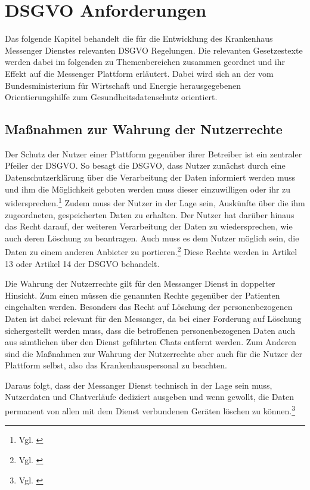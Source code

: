 \section{DSGVO Anforderungen}\label{section:dsgvo}
Das folgende Kapitel behandelt die für die Entwicklung des Krankenhaus Messenger Dienstes relevanten DSGVO Regelungen. Die relevanten Gesetzestexte werden dabei im folgenden zu Themenbereichen zusammen geordnet und ihr Effekt auf die Messenger Plattform erläutert. Dabei wird sich an der vom Bundesministerium für Wirtschaft und Energie herausgegebenen Orientierungshilfe zum Gesundheitsdatenschutz orientiert.

\subsection{Maßnahmen zur Wahrung der Nutzerrechte}\label{subsection:mzwdn}
Der Schutz der Nutzer einer Plattform gegenüber ihrer Betreiber ist ein zentraler Pfeiler der DSGVO. So besagt die DSGVO, dass Nutzer zunächst durch eine Datenschutzerklärung über die Verarbeitung der Daten informiert werden muss und ihm die Möglichkeit geboten werden muss dieser einzuwilligen oder ihr zu widersprechen.\footnote{Vgl. \cite[S. 3]{OrientierungshilfezumGesundheitsdatenschutz2018}} Zudem muss der Nutzer in der Lage sein, Auskünfte über die ihm zugeordneten, gespeicherten Daten zu erhalten. Der Nutzer hat darüber hinaus das Recht darauf, der weiteren Verarbeitung der Daten zu wiedersprechen, wie auch deren Löschung zu beantragen. Auch muss es dem Nutzer möglich sein, die Daten zu einem anderen Anbieter zu portieren.\footnote{Vgl. \cite[S. 30 ff.]{OrientierungshilfezumGesundheitsdatenschutz2018}} Diese Rechte werden in Artikel 13 oder Artikel 14 der DSGVO behandelt.

Die Wahrung der Nutzerrechte gilt für den Messanger Dienst in doppelter Hinsicht.
Zum einen müssen die genannten Rechte gegenüber der Patienten eingehalten werden. Besonders das Recht auf Löschung der personenbezogenen Daten ist dabei relevant für den Messanger, da bei einer Forderung auf Löschung sichergestellt werden muss, dass die betroffenen personenbezogenen Daten auch aus sämtlichen über den Dienst geführten Chats entfernt werden. Zum Anderen sind die Maßnahmen zur Wahrung der Nutzerrechte aber auch für die Nutzer der Plattform selbst, also das Krankenhauspersonal zu beachten.

Daraus folgt, dass der Messanger Dienst technisch in der Lage sein muss, Nutzerdaten und Chatverläufe dediziert ausgeben und wenn gewollt, die Daten permanent von allen mit dem Dienst verbundenen Geräten löschen zu können.\footnote{Vgl. \cite[S. 36 ff.]{OrientierungshilfezumGesundheitsdatenschutz2018}}

